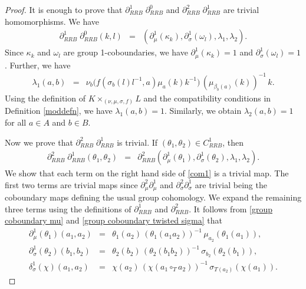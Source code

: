 \documentclass[11pt]{amsart}
\theoremstyle{thrm}
\theoremstyle{plain}
\theoremstyle{definition}
\numberwithin{equation}{section}
\begin{document}
\begin{proof}
It is enough to prove that $\partial^1_{RRB}\;  \partial^0_{RRB}$ and $\partial^2_{RRB}\;  \partial^1_{RRB}$ are trivial homomorphisms. We have 
	\begin{eqnarray*}
		\partial^1_{RRB}\;  \partial^0_{RRB}(k,l) &=& (\partial^1_{\mu}(\kappa_k), \partial^1_{\sigma}(\omega_l), \lambda_1, \lambda_2).
	\end{eqnarray*}
	Since $\kappa_k$ and $\omega_l$ are group 1-coboundaries,  we have $\partial^1_{\mu}(\kappa_k)=1$ and $\partial^1_{\sigma}(\omega_l)=1$. Further, we have
	\begin{eqnarray*}
		\lambda_1(a,b) &=& \nu_b \big(f(\sigma_b(l)l^{-1}, a)\mu_a(k)k^{-1} \big)  \,(\mu_{\beta_b(a)}(k))^{-1} \,k.
	\end{eqnarray*}
	Using the definition of $K \times_{(\nu, \mu, \sigma, f)} L$ and the compatibility conditions in Definition \ref{moddefn}, we have $\lambda_1(a, b) = 1$. Similarly, we obtain $\lambda_2(a, b) = 1$ for all $a \in A$ and $b \in B.$ 
		\par 
	
	Now we prove that $\partial^2_{RRB}\;  \partial^1_{RRB}$ is trivial. If $(\theta_1, \theta_2) \in C^1_{RRB}$, then
	\begin{eqnarray}\label{com1}
		\partial^2_{RRB}\;  \partial^1_{RRB}(\theta_1, \theta_2) &=& \partial^2_{RRB}(\partial_{\mu}^1(\theta_1), \partial_{\sigma}^1(\theta_2), \lambda_1, \lambda_2 ).
	\end{eqnarray}
	We show that each term on the right hand side of \eqref{com1} is a trivial map. The first two terms are trivial maps since $\partial_{\mu}^2\partial_{\mu}^1$ and $  \partial_{\sigma}^2\partial_{\sigma}^1$ are trivial being the coboundary maps defining the usual group cohomology. We expand the remaining three terms using the definitions of $\partial^1_{RRB}$ and $\partial^2_{RRB}$. It follows from \eqref{group coboundary mu} and \eqref{group coboundary twisted sigma} that
	\begin{eqnarray*}
		\partial^1_{\mu}(\theta_1)(a_1, a_2) &=& \theta_1(a_2)\, (\theta_1(a_1 a_2))^{-1} \,\mu_{a_2}(\theta_1(a_1)),\\
		\partial^1_{\sigma}(\theta_2)(b_1, b_2) &=& \theta_2(b_2) \,(\theta_2(b_1 b_2))^{-1} \,\sigma_{b_2}(\theta_2(b_1)),\\
		\delta^1_{\sigma}(\chi)(a_1, a_2) &=& \chi(a_2) \, (\chi(a_1 \circ_T a_2))^{-1} \,\sigma_{T(a_2)}( \chi(a_1)).
	\end{eqnarray*}
	

\end{proof}
\end{document}
